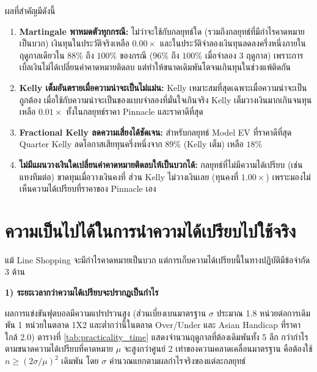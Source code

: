 ผลที่สำคัญมีดังนี้
\begin{enumerate}[label=\arabic*)]
    \item \textbf{Martingale พาหมดตัวทุกกรณี:} ไม่ว่าจะใช้กับกลยุทธ์ใด (รวมถึงกลยุทธ์ที่มีกำไรคาดหมายเป็นบวก) เงินทุนในประวัติจริงเหลือ $0.00\times$ และในประวัติจำลองเงินทุนลดลงครึ่งหนึ่งภายในฤดูกาลเดียวใน $88\%$ ถึง $100\%$ ของกรณี ($96\%$ ถึง $100\%$ เมื่อจำลอง 3 ฤดูกาล) เพราะการเบิ้ลเงินไม่ได้เปลี่ยนค่าคาดหมายติดลบ แต่ทำให้ขนาดเดิมพันโตจนเกินทุนในช่วงแพ้ติดกัน
    \item \textbf{Kelly เต็มอันตรายเมื่อความน่าจะเป็นไม่แม่น:} Kelly เหมาะสมที่สุดเฉพาะเมื่อความน่าจะเป็นถูกต้อง เมื่อใช้กับความน่าจะเป็นของแบบจำลองที่มั่นใจเกินจริง Kelly เต็มวางเงินมากเกินจนทุนเหลือ $0.01\times$ ทั้งในกลยุทธ์ราคา Pinnacle และราคาดีที่สุด
    \item \textbf{Fractional Kelly ลดความเสี่ยงได้ชัดเจน:} สำหรับกลยุทธ์ Model EV ที่ราคาดีที่สุด Quarter Kelly ลดโอกาสเสียทุนครึ่งหนึ่งจาก $89\%$ (Kelly เต็ม) เหลือ $18\%$
    \item \textbf{ไม่มีแผนวางเงินใดเปลี่ยนค่าคาดหมายติดลบให้เป็นบวกได้:} กลยุทธ์ที่ไม่มีความได้เปรียบ (เช่น แทงทีมต่อ) ขาดทุนเมื่อวางเงินคงที่ ส่วน Kelly ไม่วางเงินเลย (ทุนคงที่ $1.00\times$) เพราะมองไม่เห็นความได้เปรียบที่ราคาของ Pinnacle เอง
\end{enumerate}

\section{ความเป็นไปได้ในการนำความได้เปรียบไปใช้จริง}

แม้ Line Shopping จะมีกำไรคาดหมายเป็นบวก แต่การเก็บความได้เปรียบนี้ในทางปฏิบัติมีข้อจำกัด 3 ด้าน

\par\noindent\textbf{1) ระยะเวลากว่าความได้เปรียบจะปรากฏเป็นกำไร}\par
ผลการแข่งขันฟุตบอลมีความแปรปรวนสูง (ส่วนเบี่ยงเบนมาตรฐาน $\sigma$ ประมาณ 1.8 หน่วยต่อการเดิมพัน 1 หน่วยในตลาด 1X2 และต่ำกว่านี้ในตลาด Over/Under และ Asian Handicap ที่ราคาใกล้ 2.0) ตารางที่ \ref{tab:practicality_time} แสดงจำนวนฤดูกาลที่ต้องเดิมพันทั้ง 5 ลีก กว่ากำไรตามขนาดความได้เปรียบที่คาดหมาย $\mu$ จะสูงกว่าศูนย์ 2 เท่าของความคลาดเคลื่อนมาตรฐาน คือต้องใช้ $n \ge (2\sigma/\mu)^2$ เดิมพัน โดย $\sigma$ คำนวณแยกตามผลกำไรจริงของแต่ละกลยุทธ์

